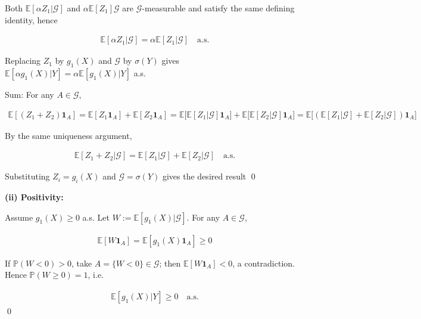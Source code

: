 \documentclass[10pt]{article}
\begin{document}
Both $\mathbb{E}[\alpha Z_1|\mathcal{G}]$ and $\alpha \mathbb{E}[Z_1]\mathcal{G}$ are $\mathcal{G}$-measurable and satisfy the same defining identity, hence 

\begin{gather*}
    \mathbb{E}[\alpha Z_1|\mathcal{G}] = \alpha \mathbb{E}[Z_1|\mathcal{G}] \quad\text{a.s.}
\end{gather*}

Replacing $Z_1$ by $g_1(X)$ and $\mathcal{G}$ by $\sigma(Y)$ gives $\mathbb{E}[\alpha g_1(X)|Y] = \alpha \mathbb{E}[g_1(X)|Y]$ a.s.

Sum: For any $A \in \mathcal{G}$,

\begin{gather*}
    \mathbb{E}[(Z_1 + Z_2)\mathbf{1}_A] = \mathbb{E}[Z_1 \mathbf{1}_A] + \mathbb{E}[Z_2 \mathbf{1}_A] = \mathbb{E}\big[\mathbb{E}[Z_1|\mathcal{G}]\mathbf{1}_A\big] +\mathbb{E}\big[\mathbb{E}[Z_2|\mathcal{G}]\mathbf{1}_A\big] = \mathbb{E}\big[(\mathbb{E}[Z_1|\mathcal{G}] + \mathbb{E}[Z_2|\mathcal{G}])\mathbf{1}_A\big]
\end{gather*}

By the same uniqueness argument, 

\begin{gather*}
    \mathbb{E}[Z_1 + Z_2|\mathcal{G}] = \mathbb{E}[Z_1|\mathcal{G}] + \mathbb{E}[Z_2|\mathcal{G}]\quad \text{a.s.}
\end{gather*}

Substituting $Z_i = g_i(X)$ and $\mathcal{G} = \sigma(Y)$ gives the desired result \qed

\newpage

\textbf{(ii) Positivity:}

Assume $g_1(X) \geq 0$ a.s. Let $W := \mathbb{E}[g_1(X)|\mathcal{G}]$. For any $A \in \mathcal{G}$,

\begin{gather*}
    \mathbb{E}[W \mathbf{1}_A] = \mathbb{E}[g_1(X)\mathbf{1}_A] \geq 0
\end{gather*}

If $\mathbb{P}(W < 0) > 0$, take $A = \{ W < 0\} \in \mathcal{G}$; then $\mathbb{E}[W \mathbf{1}_A] < 0$, a contradiction. Hence $\mathbb{P}(W \geq 0) = 1$, i.e.

\begin{gather*}
    \mathbb{E}[g_1(X)|Y] \geq 0 \quad\text{a.s.}
\end{gather*}
\qed
\end{document}
